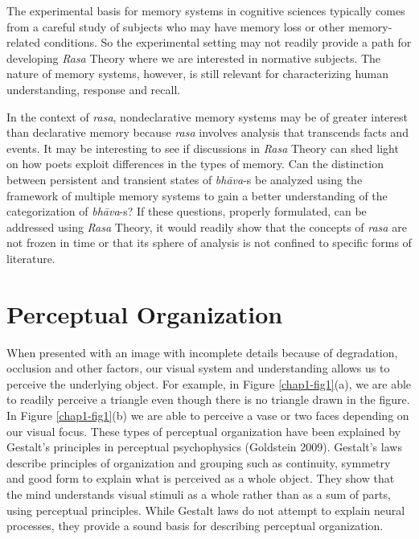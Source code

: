 The experimental basis for memory systems in cognitive sciences typically comes from a careful study of subjects who may have memory loss or other memory-related conditions. So the experimental setting may not readily provide a path for developing \textsl{Rasa} Theory where we are interested in normative subjects. The nature of memory systems, however, is still relevant for characterizing human understanding, response and recall.

In the context of \textsl{rasa}, nondeclarative memory systems may be of greater interest than declarative memory because \textsl{rasa} involves analysis that transcends facts and events. It may be interesting to see if discussions in \textsl{Rasa} Theory can shed light on how poets exploit differences in the types of memory. Can the distinction between persistent and transient states of \textsl{bhāva}-s be analyzed using the framework of multiple memory systems to gain a better understanding of the categorization of \textsl{bhāva}-s? If these questions, properly formulated, can be addressed using \textsl{Rasa} Theory, it would readily show that the concepts of \textsl{rasa} are not frozen in time or that its sphere of analysis is not confined to specific forms of literature.

\section*{Perceptual Organization}

When presented with an image with incomplete details because of degradation, occlusion and other factors, our visual system and understanding allows us to perceive the underlying object. For example, in Figure \ref{chap1-fig1}(a), we are able to readily perceive a triangle even though there is no triangle drawn in the figure. In Figure \ref{chap1-fig1}(b) we are able to perceive a vase or two faces depending on our visual focus. These types of perceptual organization have been explained by Gestalt’s principles in perceptual psychophysics (Goldstein 2009). Gestalt’s laws describe principles of organization and grouping such as continuity, symmetry and good form to explain what is perceived as a whole object. They show that the mind understands visual stimuli as a whole rather than as a sum of parts, using perceptual principles. While Gestalt laws do not attempt to explain neural processes, they provide a sound basis for describing perceptual organization. 

